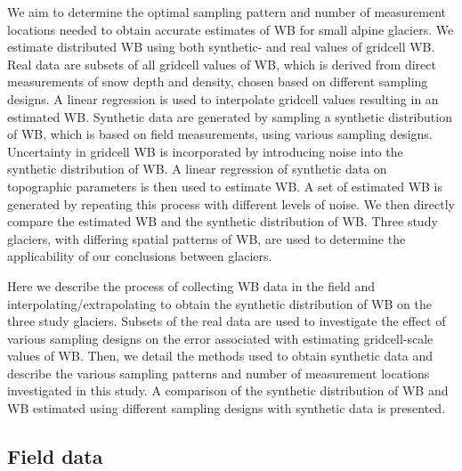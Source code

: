 \documentclass[twocolumn,letterpaper]{igs}
\begin{document}
We aim to determine the optimal sampling pattern and number of measurement locations needed to obtain accurate estimates of WB for small alpine glaciers. We estimate distributed WB using both synthetic- and real values of gridcell WB. Real data are subsets of all gridcell values of WB, which is derived from direct measurements of snow depth and density, chosen based on different sampling designs. A linear regression is used to interpolate gridcell values resulting in an estimated WB. Synthetic data are generated by sampling a synthetic distribution of WB, which is based on field measurements, using various sampling designs. Uncertainty in gridcell WB is incorporated by introducing noise into the synthetic distribution of WB. A linear regression of synthetic data on topographic parameters is then used to estimate WB. A set of estimated WB is generated by repeating this process with different levels of noise. We then directly compare the estimated WB and the synthetic distribution of WB.  Three study glaciers, with differing spatial patterns of WB, are used to determine the applicability of our conclusions between glaciers. 

Here we describe the process of collecting WB data in the field and interpolating/extrapolating to obtain the synthetic distribution of WB on the three study glaciers. Subsets of the real data are used to investigate the effect of various sampling designs on the error associated with estimating gridcell-scale values of WB. Then, we detail the methods used to obtain synthetic data and describe the various sampling patterns and number of measurement locations investigated in this study. A comparison of the synthetic distribution of WB and WB estimated using different sampling designs with synthetic data is presented. 

\subsection{Field data}
\end{document}
